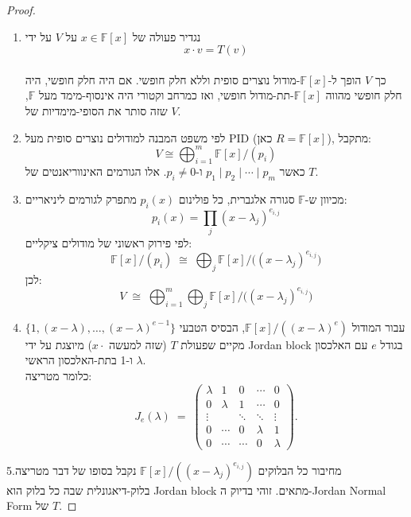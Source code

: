 \documentclass{tstextbook}
\begin{document}
\begin{proof}
  \begin{enumerate}
    \item נגדיר פעולה של \(x \in \mathbb{F}[x]\) על \(V\) על ידי \\
$$   x \cdot v = T(v)$$\\

כך \(V\) הופך ל-\(\mathbb{F}[x]\)-מודול נוצרים סופית וללא חלק חופשי. אם היה חלק חופשי, היה חלק חופשי מהווה \(\mathbb{F}[x]\)-תת-מודול חופשי, ואז כמרחב וקטורי היה אינסוף-מימד מעל \(\mathbb{F}\), שזה סותר את הסופי-מימדיות של \(V\).


    \item לפי משפט המבנה למודולים נוצרים סופית מעל PID (כאן \(R=\mathbb{F}[x]\)), מתקבל: \\
$$V \cong\bigoplus_{i=1}^m \mathbb{F}[x]/(p_i)$$
כאשר \(p_1 \mid p_2 \mid \cdots \mid p_m\) ו-\(p_i \neq 0\). אלו הגורמים האינווריאנטים של \(T\).


    \item מכיוון ש-\(\mathbb{F}\) סגורה אלגברית, כל פולינום \(p_i(x)\) מתפרק לגורמים ליניאריים: \\
$$p_i(x) = \prod_j (x - \lambda_j)^{e_{i,j}}$$
לפי פירוק ראשוני של מודולים ציקליים:\\
$$\mathbb{F}[x]/(p_i) \;\cong\; \bigoplus_j \mathbb{F}[x]/\bigl((x - \lambda_j)^{e_{i,j}}\bigr)   $$
לכן:
$$   V \;\cong\; \bigoplus_{i=1}^m \bigoplus_j \mathbb{F}[x]/\bigl((x - \lambda_j)^{e_{i,j}}\bigr)$$


    \item עבור המודול \(\mathbb{F}[x]/((x - \lambda)^e)\), הבסיס הטבעי \(\{1, (x-\lambda), \dots, (x-\lambda)^{e-1}\}\) מקיים שפעולת \(T\) (שזה למעשה \(x\cdot\)) מיוצגת על ידי Jordan block בגודל \(e\) עם האלכסון \(\lambda\) ו-1 בתת-האלכסון הראשי. \\

   כלומר מטריצה:\\
$$J_e(\lambda) \;=\;   \begin{pmatrix}   \lambda & 1      & 0      & \cdots & 0 \\   0       & \lambda & 1     & \cdots & 0 \\   \vdots  &        & \ddots & \ddots & \vdots \\   0       & \cdots & 0      & \lambda & 1 \\   0       & \cdots & \cdots & 0       & \lambda   \end{pmatrix}.
   $$


  \end{enumerate}
5.מחיבור כל הבלוקים \(\mathbb{F}[x]/((x - \lambda_j)^{e_{i,j}})\) נקבל בסופו של דבר מטריצה בלוק-דיאגונלית שבה כל בלוק הוא Jordan block מתאים. זוהי בדיוק ה-Jordan Normal Form של \(T\). 

\end{proof}
\end{document}
